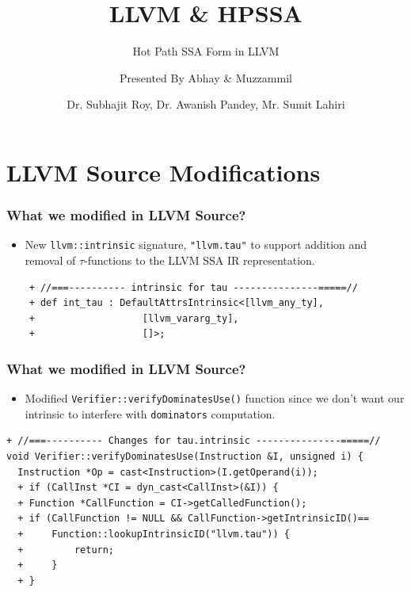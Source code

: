 \documentclass{beamer}
\title[\url{https://google.com}] %
{LLVM \& HPSSA}
\subtitle{Hot Path SSA Form in LLVM}
\author[VIP1 \& VIP2] %
{Presented By Abhay\inst{1} \& Muzzammil\inst{1}}
\institute[IDK] %
{
	\inst{1}%
	IIT Kanpur\\
	PRAISE Group
}
\date[01/03/2022] %
{Dr. Subhajit Roy, Dr. Awanish Pandey, Mr. Sumit Lahiri}
\begin{document}
\frame{\titlepage}
\footnotesize
\section{LLVM Source Modifications}

\begin{frame}[fragile]
	\frametitle{What we modified in LLVM Source?}
	\begin{itemize}
		\item New \texttt{llvm::intrinsic} signature, \texttt{"llvm.tau"} to support addition and removal of $\tau$-functions to the LLVM SSA IR representation. 
	\end{itemize}
	\begin{verbatim}
    + //===---------- intrinsic for tau ---------------=====//
    + def int_tau : DefaultAttrsIntrinsic<[llvm_any_ty],
    +                   [llvm_vararg_ty],
    +                   []>;
	\end{verbatim}
\end{frame}
\footnotesize
\begin{frame}[fragile]
\frametitle{What we modified in LLVM Source?}
\begin{itemize}
	\item Modified \texttt{Verifier::verifyDominatesUse()} function since we don't want our intrinsic to interfere with \texttt{dominators} computation.  
\end{itemize}
\begin{verbatim}
+ //===---------- Changes for tau.intrinsic ---------------=====//
void Verifier::verifyDominatesUse(Instruction &I, unsigned i) {
  Instruction *Op = cast<Instruction>(I.getOperand(i));
  +	if (CallInst *CI = dyn_cast<CallInst>(&I)) {
  +	Function *CallFunction = CI->getCalledFunction();
  +	if (CallFunction != NULL && CallFunction->getIntrinsicID()==
  +		Function::lookupIntrinsicID("llvm.tau")) {
  +			return;
  +		}
  +	}
	\end{verbatim}
\end{frame}
\end{document}
